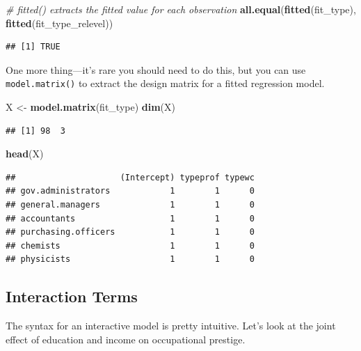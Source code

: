 \documentclass[12pt,oneside,openany]{book}
\newenvironment{Shaded}{\begin{snugshade}}{\end{snugshade}}
\newcommand{\KeywordTok}[1]{\textcolor[rgb]{0.13,0.29,0.53}{\textbf{#1}}}
\newcommand{\StringTok}[1]{\textcolor[rgb]{0.31,0.60,0.02}{#1}}
\newcommand{\CommentTok}[1]{\textcolor[rgb]{0.56,0.35,0.01}{\textit{#1}}}
\newcommand{\NormalTok}[1]{#1}
\begin{document}
\begin{Shaded}
\begin{Highlighting}[]
\CommentTok{# fitted() extracts the fitted value for each observation}
\KeywordTok{all.equal}\NormalTok{(}\KeywordTok{fitted}\NormalTok{(fit_type), }\KeywordTok{fitted}\NormalTok{(fit_type_relevel))}
\end{Highlighting}
\end{Shaded}

\begin{verbatim}
## [1] TRUE
\end{verbatim}

One more thing---it's rare you should need to do this, but you can use
\texttt{model.matrix()} to extract the design matrix for a fitted
regression model.

\begin{Shaded}
\begin{Highlighting}[]
\NormalTok{X <-}\StringTok{ }\KeywordTok{model.matrix}\NormalTok{(fit_type)}
\KeywordTok{dim}\NormalTok{(X)}
\end{Highlighting}
\end{Shaded}

\begin{verbatim}
## [1] 98  3
\end{verbatim}

\begin{Shaded}
\begin{Highlighting}[]
\KeywordTok{head}\NormalTok{(X)}
\end{Highlighting}
\end{Shaded}

\begin{verbatim}
##                     (Intercept) typeprof typewc
## gov.administrators            1        1      0
## general.managers              1        1      0
## accountants                   1        1      0
## purchasing.officers           1        1      0
## chemists                      1        1      0
## physicists                    1        1      0
\end{verbatim}

\subsection{Interaction Terms}\label{interaction-terms-1}

The syntax for an interactive model is pretty intuitive. Let's look at
the joint effect of education and income on occupational prestige.
\end{document}
